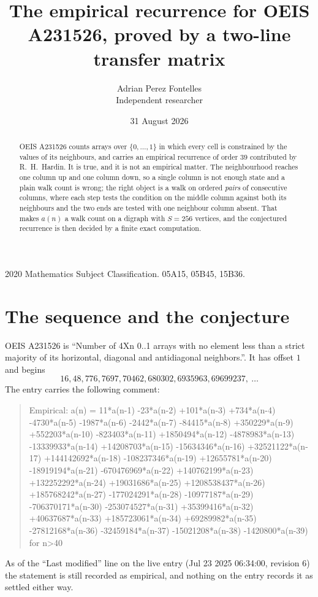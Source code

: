 \documentclass[11pt,a4paper]{article}
\title{The empirical recurrence for OEIS A231526, proved by a two-line transfer matrix}
\author{Adrian Perez Fontelles\\ \small Independent researcher}
\date{31 August 2026}
\theoremstyle{plain}
\theoremstyle{definition}
\begin{document}
\maketitle

\begin{abstract}
OEIS A231526 counts arrays over $\{0,\dots,1\}$ in which every cell is constrained by the
values of its neighbours, and carries an empirical recurrence of order $39$ contributed
by R.~H.~Hardin. It is true, and it is not an empirical matter. The neighbourhood reaches one
column up and one column down, so a single column is not enough state and a plain walk count
is wrong; the right object is a walk on ordered \emph{pairs} of consecutive columns, where
each step tests the condition on the middle column against both its neighbours and the two
ends are tested with one neighbour column absent. That makes $a(n)$ a walk count on a digraph
with $S=256$ vertices, and the conjectured recurrence is then decided by a finite exact
computation.
\end{abstract}

\noindent\small 2020 Mathematics Subject Classification. 05A15, 05B45, 15B36.\normalsize

\section{The sequence and the conjecture}

OEIS A231526 is ``Number of 4Xn 0..1 arrays with no element less than a strict majority of its horizontal, diagonal and antidiagonal neighbors.''. It has offset $1$ and begins
\[
16, 48, 776, 7697, 70462, 680302, 6935963, 69699237,\ \dots
\]
The entry carries the following comment:
\begin{quote}\small
Empirical: a(n) = 11*a(n-1) -23*a(n-2) +101*a(n-3) +734*a(n-4) -4730*a(n-5) -1987*a(n-6) -2442*a(n-7) -84415*a(n-8) +350229*a(n-9) +552203*a(n-10) -823403*a(n-11) +1850494*a(n-12) -4878983*a(n-13) -13339933*a(n-14) +14208703*a(n-15) -15634346*a(n-16) +32521122*a(n-17) +144142692*a(n-18) -108237346*a(n-19) +12655781*a(n-20) -18919194*a(n-21) -670476969*a(n-22) +140762199*a(n-23) +132252292*a(n-24) +19031686*a(n-25) +1208538437*a(n-26) +185768242*a(n-27) -177024291*a(n-28) -10977187*a(n-29) -706370171*a(n-30) -253074527*a(n-31) +35399416*a(n-32) +40637687*a(n-33) +185723061*a(n-34) +69289982*a(n-35) -27812168*a(n-36) -32459184*a(n-37) -15021208*a(n-38) -1420800*a(n-39) for n>40
\end{quote}
As of the ``Last modified'' line on the live entry (Jul 23 2025 06:34:00, revision 6) the statement is
still recorded as empirical, and nothing on the entry records it as settled either way.
\end{document}

